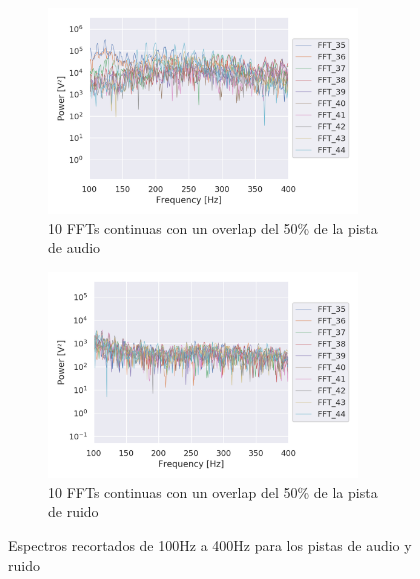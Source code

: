 \begin{figure}[t!]
	\centering
	\begin{subfigure}[t]{\textwidth}
		\centering
		\includegraphics[width=0.9\textwidth]{figures/audio_ffts}
		\caption{10 \acrshort{FFT}s continuas con un overlap del 50\% de la pista de audio}
		\label{fig: ffts_audio}
	\end{subfigure}
	\vspace*{10pt}
	\begin{subfigure}[t]{\textwidth}
		\centering
		\includegraphics[width=0.9\textwidth]{figures/noise_ffts}
		\caption{10 \acrshort{FFT}s continuas con un overlap del 50\% de la pista de ruido}
		\label{fig: ffts_noise}
	\end{subfigure}
	\caption{Espectros recortados de 100Hz a 400Hz para los pistas de audio y ruido}
	\label{fig: ffts_spectrum}
\end{figure}

